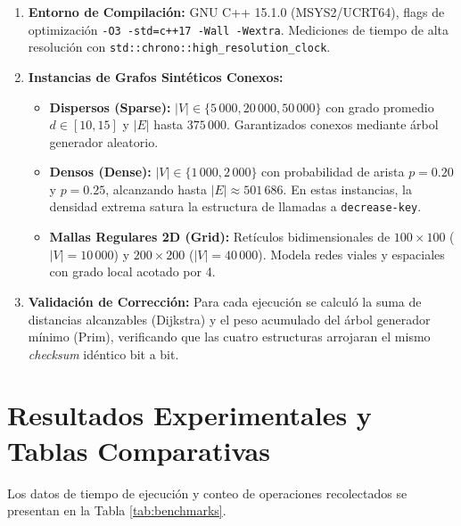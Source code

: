 \documentclass[11pt,a4paper]{article}
\begin{document}
\begin{enumerate}
    \item \textbf{Entorno de Compilación:} GNU C++ 15.1.0 (MSYS2/UCRT64), flags de optimización \texttt{-O3 -std=c++17 -Wall -Wextra}. Mediciones de tiempo de alta resolución con \texttt{std::chrono::high\_resolution\_clock}.
    \item \textbf{Instancias de Grafos Sintéticos Conexos:}
    \begin{itemize}
        \item \textbf{Dispersos (Sparse):} $|V| \in \{5\,000, 20\,000, 50\,000\}$ con grado promedio $d \in [10, 15]$ y $|E|$ hasta $375\,000$. Garantizados conexos mediante árbol generador aleatorio.
        \item \textbf{Densos (Dense):} $|V| \in \{1\,000, 2\,000\}$ con probabilidad de arista $p = 0.20$ y $p = 0.25$, alcanzando hasta $|E| \approx 501\,686$. En estas instancias, la densidad extrema satura la estructura de llamadas a \texttt{decrease-key}.
        \item \textbf{Mallas Regulares 2D (Grid):} Retículos bidimensionales de $100 \times 100$ ($|V|=10\,000$) y $200 \times 200$ ($|V|=40\,000$). Modela redes viales y espaciales con grado local acotado por 4.
    \end{itemize}
    \item \textbf{Validación de Corrección:} Para cada ejecución se calculó la suma de distancias alcanzables (Dijkstra) y el peso acumulado del árbol generador mínimo (Prim), verificando que las cuatro estructuras arrojaran el mismo \textit{checksum} idéntico bit a bit.
\end{enumerate}

\section{Resultados Experimentales y Tablas Comparativas}

Los datos de tiempo de ejecución y conteo de operaciones recolectados se presentan en la Tabla \ref{tab:benchmarks}.
\end{document}
